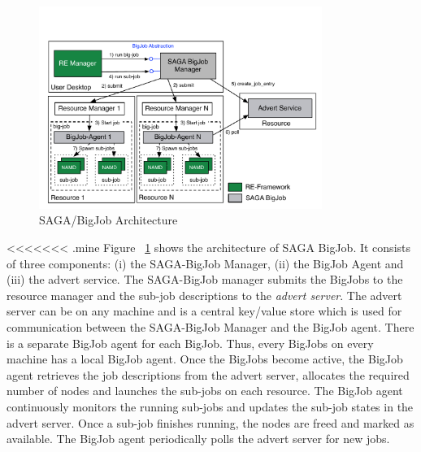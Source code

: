 \documentclass{rspublic}
\begin{document}
\begin{figure}[t]
      \centering
          \includegraphics[width=0.82\textwidth]{../figures/Bigjob_arch.pdf}
          \caption{\footnotesize SAGA/BigJob Architecture
              }
      \label{fig:bigjob}
\end{figure}

<<<<<<< .mine
Figure ~\ref{fig:bigjob} shows the architecture of SAGA BigJob.  It
consists of three components: (i) the SAGA-BigJob Manager, (ii) the
BigJob Agent and (iii) the advert service. The SAGA-BigJob manager
submits the BigJobs to the resource manager and the sub-job
descriptions to the \emph{advert server}. The advert server can be on
any machine and is a central key/value store which is used for
communication between the SAGA-BigJob Manager and the BigJob
agent. There is a separate BigJob agent for each BigJob. Thus, every
BigJobs on every machine has a local BigJob agent. Once the BigJobs
become active, the BigJob agent retrieves the job descriptions from
the advert server, allocates the required number of nodes and launches
the sub-jobs on each resource. The BigJob agent continuously monitors
the running sub-jobs and updates the sub-job states in the advert
server. Once a sub-job finishes running, the nodes are freed and
marked as available. The BigJob agent periodically polls the advert
server for new jobs.


% 
\end{document}

